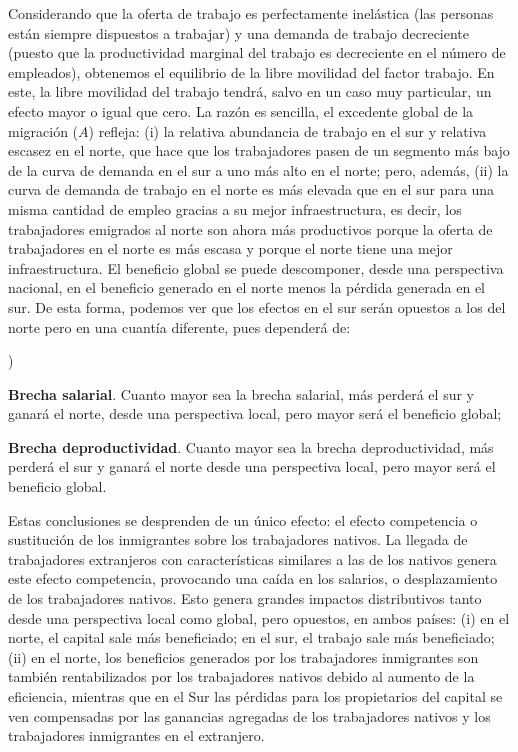 \documentclass[10pt,a4paper]{article}
\newcounter{alphaitem}
\newenvironment{la}
      {\begin{list}{\alph{alphaitem})}{%
          \usecounter{alphaitem}%
          \setlength{\leftmargin}{1cm}%
          \setlength{\parskip}{3pt}%
          \setlength{\itemsep}{0pt}%
          \setlength{\parsep}{0pt}%
      }}
      {\end{list}}
\begin{document}
Considerando que la oferta de trabajo es perfectamente inelástica (las personas están siempre dispuestos a trabajar) y una demanda de trabajo decreciente (puesto que la productividad marginal del trabajo es decreciente en el número de empleados), obtenemos el equilibrio de la libre movilidad del factor trabajo. En este, la libre movilidad del trabajo tendrá, salvo en un caso muy particular, un efecto mayor o igual que cero. La razón es sencilla, el excedente global de la migración ($A$) refleja: (i) la relativa abundancia de trabajo en el sur y relativa escasez en el norte, que hace que los trabajadores pasen de un segmento más bajo de la curva de demanda en el sur a uno más alto en el norte; pero, además, (ii) la curva de demanda de trabajo en el norte es más elevada que en el sur para una misma cantidad de empleo gracias a su mejor infraestructura, es decir, los trabajadores emigrados al norte son ahora más productivos porque la oferta de trabajadores en el norte es más escasa y porque el norte tiene una mejor infraestructura. El beneficio global se puede descomponer, desde una perspectiva nacional, en el beneficio generado en el norte menos la pérdida generada en el sur. De esta forma, podemos ver que los efectos en el sur serán opuestos a los del norte pero en una cuantía diferente, pues dependerá de:
\begin{la}
    \item \textbf{Brecha salarial}. Cuanto mayor sea la brecha salarial, más perderá el sur y ganará el norte, desde una perspectiva local, pero mayor será el beneficio global;
    \item \textbf{Brecha deproductividad}. Cuanto mayor sea la brecha deproductividad, más perderá el sur y ganará el norte desde una perspectiva local, pero mayor será el beneficio global.
\end{la}

Estas conclusiones se desprenden de un único efecto: el efecto competencia o sustitución de los inmigrantes sobre los trabajadores nativos. La llegada de trabajadores extranjeros con características similares a las de los nativos genera este efecto competencia, provocando una caída en los salarios, o desplazamiento de los trabajadores nativos. Esto genera grandes impactos distributivos tanto desde una perspectiva local como global, pero opuestos, en ambos países: (i) en el norte, el capital sale más beneficiado; en el sur, el trabajo sale más beneficiado; (ii) en el norte, los beneficios generados por los trabajadores inmigrantes son también rentabilizados por los trabajadores nativos debido al aumento de la eficiencia, mientras que en el Sur las pérdidas para los propietarios del capital se ven compensadas por las ganancias agregadas de los trabajadores nativos y los trabajadores inmigrantes en el extranjero.
\end{document}
